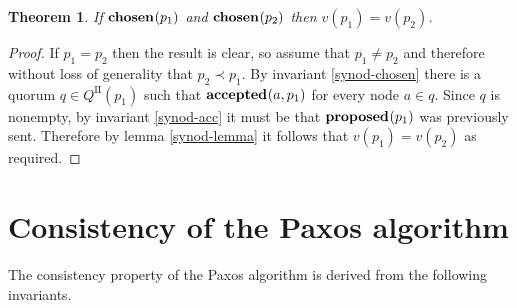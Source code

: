 \documentclass[journal]{IEEEtran}
\newtheorem{theorem}{Theorem}
\begin{document}
\begin{theorem}\label{synod-safety-theorem} If $\mathbf{chosen}_{}(p_1)$ and
$\mathbf{chosen}_{}(p_2)$ then $v(p_1) = v(p_2)$.  \end{theorem}

\begin{proof} If $p_1 = p_2$ then the result is clear, so assume that $p_1 \ne
p_2$ and therefore without loss of generality that $p_2 \prec p_1$. By
invariant \ref{synod-chosen} there is a quorum $q \in Q^\textrm{II}(p_1)$ such
that $\mathbf{accepted}_{}(a,p_1)$ for every node $a \in q$. Since $q$ is nonempty, by
invariant \ref{synod-acc} it must be that $\mathbf{proposed}_{}(p_1)$ was previously sent.
Therefore by lemma \ref{synod-lemma} it follows that $v(p_1) = v(p_2)$ as
required.  \end{proof}




\section{Consistency of the Paxos algorithm}

The consistency property of the Paxos algorithm is derived from the following
invariants.
\end{document}
